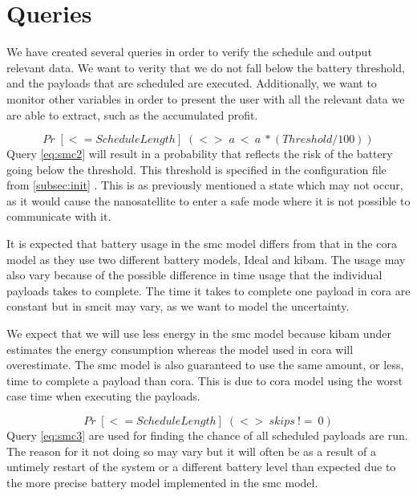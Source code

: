 \section{Queries}\label{sec:queries}
We have created several queries in order to verify the schedule and output relevant data. We want to verity that we do not fall below the battery threshold, and the payloads that are scheduled are executed. Additionally, we want to monitor other variables in order to present the user with all the relevant data we are able to extract, such as the accumulated profit.

\begin{equation} \label{eq:smc2}
	Pr\; [<=ScheduleLength] \; (<>\; a\ <\ a\ *(Threshold/100))
\end{equation}
Query \ref{eq:smc2} will result in a probability that reflects the risk of the battery going below the threshold. This threshold is specified in the configuration file from \cref{subsec:init} . This is as previously mentioned a state which may not occur, as it would cause the nanosatellite to enter a safe mode where it is not possible to communicate with it.

It is expected that battery usage in the \gls{smc} model differs from that in the \gls{cora} model as they use two different battery models, Ideal and \gls{kibam}. The usage may also vary because of the possible difference in time usage that the individual payloads takes to complete. The time it takes to complete one payload in \gls{cora} are constant but in \gls{smc}it may vary, as we want to model the uncertainty.

We expect that we will use less energy in the \gls{smc} model because \gls{kibam} under estimates the energy consumption whereas the model used in \gls{cora} will overestimate. The \gls{smc} model is also guaranteed to use the same amount, or less, time to complete a payload than \gls{cora}. This is due to \gls{cora} model using the worst case time when executing the payloads.

\begin{equation} \label{eq:smc3}
	Pr\; [<=ScheduleLength] \; (<> \ skips \ !=\ 0)
\end{equation}
Query \ref{eq:smc3} are used for finding the chance of all scheduled payloads are run. The reason for it not doing so may vary but it will often be as a result of a untimely restart of the system or a different battery level than expected due to the more precise battery model implemented in the \gls{smc} model.

